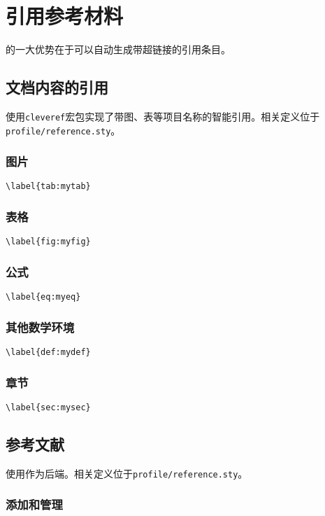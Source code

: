 \chapter{引用参考材料}

的一大优势在于可以自动生成带超链接的引用条目。

\section{文档内容的引用}

使用\lstinline|cleveref|宏包实现了带图、表等项目名称的智能引用。相关定义位于\lstinline|profile/reference.sty|。

\subsection{图片}

\lstinline|\label{tab:mytab}|

\subsection{表格}

\lstinline|\label{fig:myfig}|

\subsection{公式}

\lstinline|\label{eq:myeq}|


\subsection{其他数学环境}

\lstinline|\label{def:mydef}|

\subsection{章节}


\lstinline|\label{sec:mysec}|

\section{参考文献}

使用作为后端。相关定义位于\lstinline|profile/reference.sty|。

\subsection{添加和管理}

